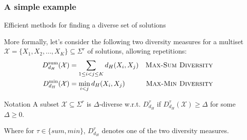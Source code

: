 \documentclass{beamer}
\begin{document}
\begin{frame}
    \frametitle{A simple example}
    \begin{table}[h!]
        \centering
        \caption{Longest common subsequences of two input strings $X=ABABCDDEE$ and $Y=ABCBAEEDD.$ over $\Sigma = \{A, B, C, D, E\}$}
    \end{table}

\end{frame}




\begin{frame}{Efficient methods for finding a diverse set of solutions}

    More formally, let's consider the following two diversity measures for a multiset $\mathcal{X} = \{X_1, X_2, \ldots, X_K\} \subseteq \Sigma^r$ of solutions, allowing repetitions:
    \begin{align}
        D_{d_H}^{\text{sum}} (\mathcal{X}) &= \sum_{1 \leq i < j \leq K} d_H(X_i, X_j) & \text{\textsc{Max-Sum Diversity}} \\
        D_{d_H}^{\text{min}} (\mathcal{X}) &= \min_{i < j} d_H(X_i, X_j) & \text{\textsc{Max-Min Diversity}}
    \end{align}

    \begin{block}{Notation}
        A subset $\mathcal{X} \subseteq \Sigma^r$ is $\Delta$-diverse w.r.t. $D_{d_H}^{\tau}$ if $D_{d_H}^{\tau}(\mathcal{X}) \geq \Delta$ for some $\Delta \geq 0$.
    \end{block}
    Where for $\tau \in \{sum, min\}$, $D_{d_H}^{\tau}$ denotes one of the two diversity measures.
\end{frame}
\end{document}

